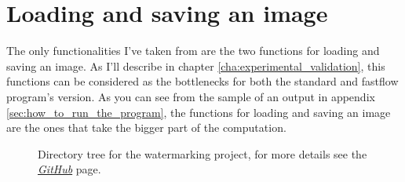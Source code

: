     \section{Loading and saving an image} %
    \label{sec:loading_and_saving_an_image}
        The only functionalities I've taken from \cite{cimg} are the two functions for loading
        and saving an image. As I'll describe in chapter \ref{cha:experimental_validation}, this functions can
        be considered as the bottlenecks for both the standard and fastflow program's version. As you can see
        from the sample of an output in appendix \ref{sec:how_to_run_the_program}, the functions for loading
        and saving an image are the ones that take the bigger part of the computation.
    \begin{figure}[b!]
        \caption{Directory tree for the watermarking project, for more details see the
        \href{https://github.com/germz01/PDS_project}{\textit{GitHub}} page.}
        \label{fig:directory_tree}
    \end{figure}

